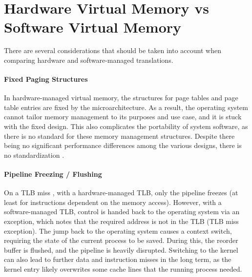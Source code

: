 







\section{Hardware Virtual Memory vs Software Virtual Memory}

There are several considerations that should be taken into account when comparing hardware and
software-managed translations.

\paragraph{Fixed Paging Structures} In hardware-managed virtual memory, the structures for page tables
and page table entries are fixed by the microarchitecture. As a result, the operating system cannot tailor
memory management to its purposes and use case, and it is stuck with the fixed design.
This also complicates the portability of system software, as there is no standard for these memory management
structures. Despite there being no significant performance differences among the various designs,
there is no standardization \cite{jacob1998look}.

\paragraph{Pipeline Freezing / Flushing} On a TLB miss ,
with a hardware-managed TLB, only the pipeline freezes (at least for instructions dependent on
the memory access). However, with a software-managed TLB, control is handed back to the operating system
via an exception, which notes that the required address is not in the TLB (TLB miss exception).
The jump back to the operating system causes a context switch, requiring the state of the current process
to be saved. During this, the reorder buffer is flushed, and the pipeline is heavily disrupted.
Switching to the kernel can also lead to further data and instruction misses in the long term,
as the kernel entry likely overwrites some cache lines that the running process needed. 

